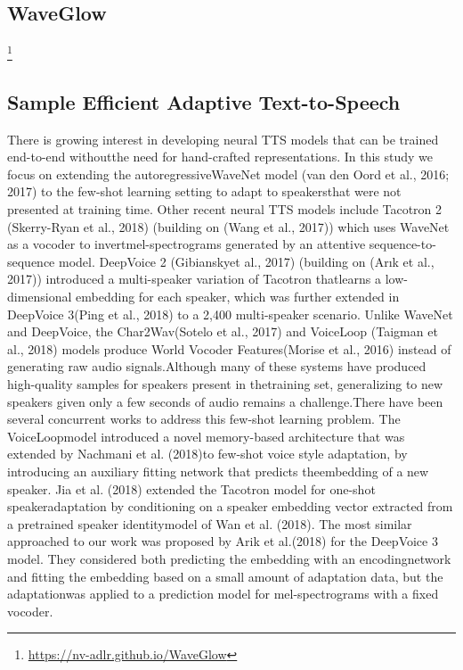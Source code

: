 \subsection{WaveGlow}
\footnote{\url{https://nv-adlr.github.io/WaveGlow}}


\subsection{Sample Efficient Adaptive Text-to-Speech}

There is growing interest in developing neural TTS models that can be trained end-to-end withoutthe need for hand-crafted representations.  In this study we focus on extending the autoregressiveWaveNet model (van den Oord et al., 2016; 2017) to the few-shot learning setting to adapt to speakersthat were not presented at training time. Other recent neural TTS models include Tacotron 2 (Skerry-Ryan et al., 2018) (building on (Wang et al., 2017)) which uses WaveNet as a vocoder to invertmel-spectrograms generated by an attentive sequence-to-sequence model. DeepVoice 2 (Gibianskyet al., 2017) (building on (Arık et al., 2017)) introduced a multi-speaker variation of Tacotron thatlearns a low-dimensional embedding for each speaker, which was further extended in DeepVoice 3(Ping et al., 2018) to a 2,400 multi-speaker scenario. Unlike WaveNet and DeepVoice, the Char2Wav(Sotelo et al., 2017) and VoiceLoop (Taigman et al., 2018) models produce World Vocoder Features(Morise et al., 2016) instead of generating raw audio signals.Although many of these systems have produced high-quality samples for speakers present in thetraining set, generalizing to new speakers given only a few seconds of audio remains a challenge.There have been several concurrent works to address this few-shot learning problem. The VoiceLoopmodel introduced a novel memory-based architecture that was extended by Nachmani et al. (2018)to few-shot voice style adaptation,  by introducing an auxiliary fitting network that predicts theembedding of a new speaker.  Jia et al. (2018) extended the Tacotron model for one-shot speakeradaptation by conditioning on a speaker embedding vector extracted from a pretrained speaker identitymodel of Wan et al. (2018). The most similar approached to our work was proposed by Arik et al.(2018) for the DeepVoice 3 model. They considered both predicting the embedding with an encodingnetwork and fitting the embedding based on a small amount of adaptation data, but the adaptationwas applied to a prediction model for mel-spectrograms with a fixed vocoder.

